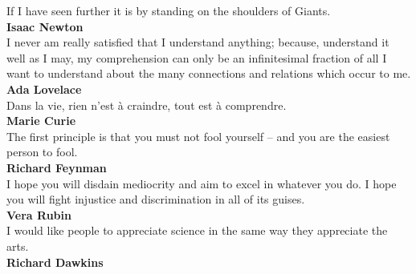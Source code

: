 \cleardoublepage\thispagestyle{empty}
\vspace{10cm}\hspace{10cm}
\parbox{6cm}{If I have seen further it is by standing on the shoulders of Giants.\\[10pt]
\textbf{Isaac Newton}\\[40pt]
I never am really satisfied that I understand anything; because, understand it well as I may, my comprehension can only be an infinitesimal fraction of all I want to understand about the many connections and relations which occur to me.\\[10pt]
\textbf{Ada Lovelace}\\[40pt]
Dans la vie, rien n'est à craindre, tout est à comprendre.\\[10pt]
\textbf{Marie Curie}\\[40pt]
The first principle is that you must not fool yourself -- and you are the easiest person to fool.\\[10pt]
\textbf{Richard Feynman}\\[40pt]
I hope you will disdain mediocrity and aim to excel in whatever you do. I hope you will fight injustice and discrimination in all of its guises.\\[10pt]
\textbf{Vera Rubin}\\[40pt]
I would like people to appreciate science in the same way they appreciate the arts.\\[10pt]
\textbf{Richard Dawkins}}

